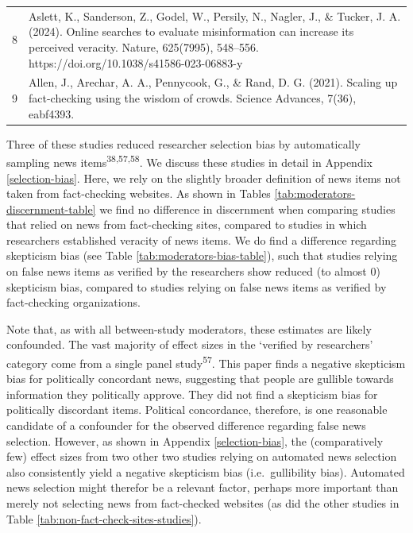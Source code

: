 \documentclass[
  man]{apa6}
\begin{document}
\begin{table}[tbp]
\begin{center}
\begin{threeparttable}
{\begin{tabular}{lm{16cm}}
8 & Aslett, K., Sanderson, Z., Godel, W., Persily, N., Nagler, J., \& Tucker, J. A. (2024). Online searches to evaluate misinformation can increase its perceived veracity. Nature, 625(7995), 548–556. https://doi.org/10.1038/s41586-023-06883-y\\
9 & Allen, J., Arechar, A. A., Pennycook, G., \& Rand, D. G. (2021). Scaling up fact-checking using the wisdom of crowds. Science Advances, 7(36), eabf4393.\\
\bottomrule
\end{tabular}

}

\end{threeparttable}
\end{center}

\end{table}

Three of these studies reduced researcher selection bias by automatically sampling news items\textsuperscript{38,57,58}. We discuss these studies in detail in Appendix \ref{selection-bias}. Here, we rely on the slightly broader definition of news items not taken from fact-checking websites. As shown in Tables \ref{tab:moderators-discernment-table} we find no difference in discernment when comparing studies that relied on news from fact-checking sites, compared to studies in which researchers established veracity of news items. We do find a difference regarding skepticism bias (see Table \ref{tab:moderators-bias-table}), such that studies relying on false news items as verified by the researchers show reduced (to almost 0) skepticism bias, compared to studies relying on false news items as verified by fact-checking organizations.

Note that, as with all between-study moderators, these estimates are likely confounded. The vast majority of effect sizes in the `verified by researchers' category come from a single panel study\textsuperscript{57}. This paper finds a negative skepticism bias for politically concordant news, suggesting that people are gullible towards information they politically approve. They did not find a skepticism bias for politically discordant items. Political concordance, therefore, is one reasonable candidate of a confounder for the observed difference regarding false news selection. However, as shown in Appendix \ref{selection-bias}, the (comparatively few) effect sizes from two other two studies relying on automated news selection also consistently yield a negative skepticism bias (i.e.~gullibility bias). Automated news selection might therefor be a relevant factor, perhaps more important than merely not selecting news from fact-checked websites (as did the other studies in Table \ref{tab:non-fact-check-sites-studies}).
\end{document}
